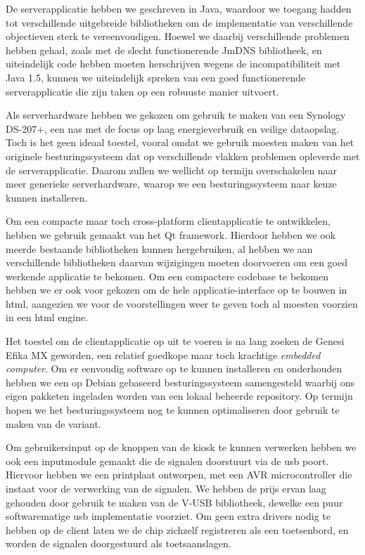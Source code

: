 De serverapplicatie hebben we geschreven in Java, waardoor we toegang hadden tot verschillende uitgebreide bibliotheken om de implementatie van verschillende objectieven sterk te vereenvoudigen. Hoewel we daarbij verschillende problemen hebben gehad, zoals met de slecht functionerende JmDNS bibliotheek, en uiteindelijk code hebben moeten herschrijven wegens de incompatibiliteit met Java 1.5, kunnen we uiteindelijk spreken van een goed functionerende serverapplicatie die zijn taken op een robuuste manier uitvoert.

Als serverhardware hebben we gekozen om gebruik te maken van een Synology DS-207+, een \ac{nas} met de focus op laag energieverbruik en veilige dataopslag. Toch is het geen ideaal toestel, vooral omdat we gebruik moesten maken van het originele besturingssysteem dat op verschillende vlakken problemen opleverde met de serverapplicatie. Daarom zullen we wellicht op termijn overschakelen naar meer generieke serverhardware, waarop we een besturingssysteem naar keuze kunnen installeren.

Om een compacte maar toch cross-platform clientapplicatie te ontwikkelen, hebben we gebruik gemaakt van het Qt framework. Hierdoor hebben we ook meerde bestaande bibliotheken kunnen hergebruiken, al hebben we aan verschillende bibliotheken daarvan wijzigingen moeten doorvoeren om een goed werkende applicatie te bekomen. Om een compactere codebase te bekomen hebben we er ook voor gekozen om de hele applicatie-interface op te bouwen in \ac{html}, aangezien we voor de voorstellingen weer te geven toch al moesten voorzien in een \ac{html} engine.

Het toestel om de clientapplicatie op uit te voeren is na lang zoeken de Genesi Efika MX geworden, een relatief goedkope maar toch krachtige \emph{embedded computer}. Om er eenvoudig software op te kunnen installeren en onderhouden hebben we een op Debian gebaseerd besturingssysteem samengesteld waarbij ons eigen pakketen ingeladen worden van een lokaal beheerde repository. Op termijn hopen we het besturingssysteem nog te kunnen optimaliseren door gebruik te maken van de  variant.

Om gebruikersinput op de knoppen van de kiosk te kunnen verwerken hebben we ook een inputmodule gemaakt die de signalen doorstuurt via de \ac{usb} poort. Hiervoor hebben we een printplaat ontworpen, met een AVR microcontroller die instaat voor de verwerking van de signalen. We hebben de prijs ervan laag gehouden door gebruik te maken van de V-USB bibliotheek, dewelke een puur softwarematige \ac{usb} implementatie voorziet. Om geen extra drivers nodig te hebben op de client laten we de chip zichzelf registreren als een toetsenbord, en worden de signalen doorgestuurd als toetsaanslagen.

